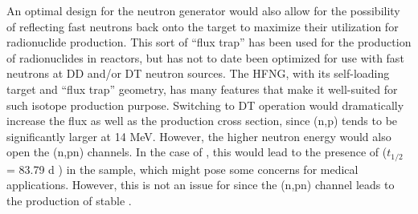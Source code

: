  
% 
% 
% 
% 
% 
% 
% 



An optimal design for the neutron generator would also allow for the possibility of reflecting fast neutrons back onto the target to maximize their utilization for radionuclide production.
 This sort of \enquote{flux trap} has been used for the production of radionuclides in reactors, but has not to date been optimized for use with fast neutrons  at DD and/or DT neutron sources.
 The HFNG, with its self-loading target and \enquote{flux trap} geometry, has many features that make it well-suited for such isotope production purpose.
 Switching to DT operation would dramatically increase the flux as well as the production cross section, since (n,p) tends to be significantly larger at 14 MeV.
 However, the higher neutron energy would also open the (n,pn) channels.
 In the case of , this would lead to the presence of  ($t_{1/2}$ = 83.79 d \cite{Wu2000}) in the sample, which might pose some concerns for medical applications.
 However, this is not an issue for  since the (n,pn) channel leads to the production of stable .
 
